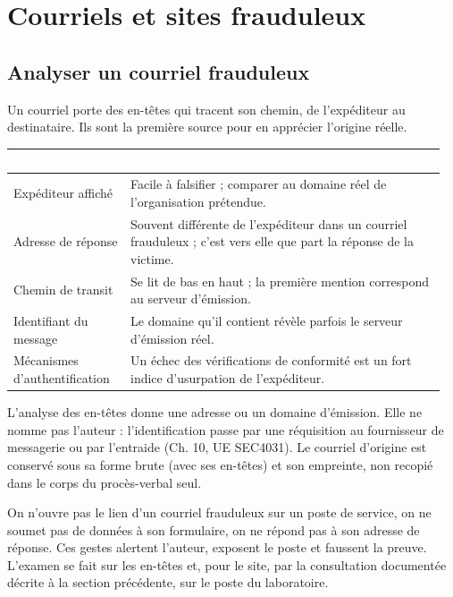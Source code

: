 \section{Courriels et sites frauduleux}

\subsection{Analyser un courriel frauduleux}

Un courriel porte des en-têtes qui tracent son chemin, de l'expéditeur au destinataire. Ils sont la première source pour en apprécier l'origine réelle.

\begin{longtable}{p{0.26\linewidth}p{0.70\linewidth}}
\rowcolor{TableauEntete}\textcolor{white}{\bfseries En-tête} & \textcolor{white}{\bfseries Lecture} \\ \hline
Expéditeur affiché & Facile à falsifier ; comparer au domaine réel de l'organisation prétendue. \\
Adresse de réponse & Souvent différente de l'expéditeur dans un courriel frauduleux ; c'est vers elle que part la réponse de la victime. \\
Chemin de transit & Se lit de bas en haut ; la première mention correspond au serveur d'émission. \\
Identifiant du message & Le domaine qu'il contient révèle parfois le serveur d'émission réel. \\
Mécanismes d'authentification & Un échec des vérifications de conformité est un fort indice d'usurpation de l'expéditeur. \\
\end{longtable}

L'analyse des en-têtes donne une adresse ou un domaine d'émission. Elle ne nomme pas l'auteur : l'identification passe par une réquisition au fournisseur de messagerie ou par l'entraide (Ch. 10, UE SEC4031). Le courriel d'origine est conservé sous sa forme brute (avec ses en-têtes) et son empreinte, non recopié dans le corps du procès-verbal seul.

\begin{boxalert}
On n'ouvre pas le lien d'un courriel frauduleux sur un poste de service, on ne soumet pas de données à son formulaire, on ne répond pas à son adresse de réponse. Ces gestes alertent l'auteur, exposent le poste et faussent la preuve. L'examen se fait sur les en-têtes et, pour le site, par la consultation documentée décrite à la section précédente, sur le poste du laboratoire.
\end{boxalert}

